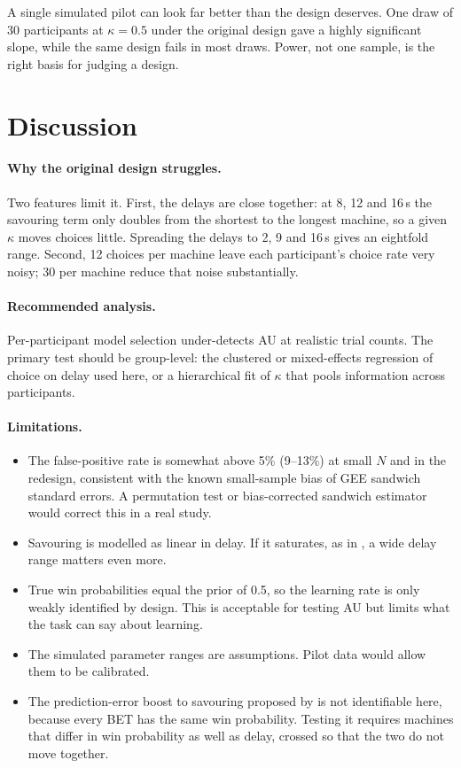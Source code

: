 \documentclass[10pt,twocolumn]{article}
\begin{document}
A single simulated pilot can look far better than the design deserves. One draw
of 30 participants at $\kappa = 0.5$ under the original design gave a highly
significant slope, while the same design fails in most draws. Power, not one
sample, is the right basis for judging a design.

\section{Discussion}

\paragraph{Why the original design struggles.} Two features limit it. First,
the delays are close together: at 8, 12 and 16\,s the savouring term only
doubles from the shortest to the longest machine, so a given $\kappa$ moves
choices little. Spreading the delays to 2, 9 and 16\,s gives an eightfold
range. Second, 12 choices per machine leave each participant's choice rate very
noisy; 30 per machine reduce that noise substantially.

\paragraph{Recommended analysis.} Per-participant model selection under-detects
AU at realistic trial counts. The primary test should be group-level: the
clustered or mixed-effects regression of choice on delay used here, or a
hierarchical fit of $\kappa$ that pools information across participants.

\paragraph{Limitations.}
\begin{itemize}
\item The false-positive rate is somewhat above 5\% (9--13\%) at small $N$ and
in the redesign, consistent with the known small-sample bias of GEE sandwich
standard errors. A permutation test or bias-corrected sandwich estimator would
correct this in a real study.
\item Savouring is modelled as linear in delay. If it saturates, as in
\citet{iigaya2016}, a wide delay range matters even more.
\item True win probabilities equal the prior of 0.5, so the learning rate is
only weakly identified by design. This is acceptable for testing AU but limits
what the task can say about learning.
\item The simulated parameter ranges are assumptions. Pilot data would allow
them to be calibrated.
\item The prediction-error boost to savouring proposed by \citet{iigaya2016} is
not identifiable here, because every BET has the same win probability. Testing
it requires machines that differ in win probability as well as delay, crossed
so that the two do not move together.
\end{itemize}
\end{document}

